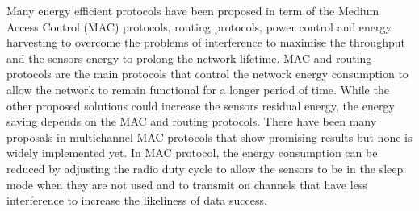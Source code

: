 Many energy efficient protocols have been proposed in term of the Medium Access Control (MAC) protocols, routing protocols, power control and energy harvesting to overcome the problems of interference to maximise the throughput and the sensors energy to prolong the network lifetime. 
MAC and routing protocols are the main protocols that control the network energy consumption to allow the network to remain functional for a longer period of time. While the other proposed solutions could increase the sensors residual energy, the energy saving depends on the MAC and routing protocols.
There have been many proposals in multichannel MAC protocols that show promising results but none is widely implemented yet. In MAC protocol, the energy consumption can be reduced by adjusting the radio duty cycle to allow the sensors to be in the sleep mode when they are not used and to transmit on channels that have less interference to increase the likeliness of data success.
 




